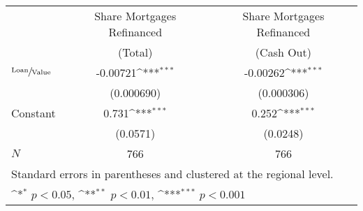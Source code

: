 {
\def\sym#1{\ifmmode^{#1}\else\(^{#1}\)\fi}
\begin{tabular}{l*{2}{c}}
\hline\hline
& Share Mortgages Refinanced   & Share Mortgages Refinanced \\
& (Total) & (Cash Out) \\ 
\hline
$\sfrac{\text{Loan}}{\text{Value}}$&    -0.00721\sym{***}&    -0.00262\sym{***}\\
            &  (0.000690)         &  (0.000306)         \\
Constant     &       0.731\sym{***}&       0.252\sym{***}\\
            &    (0.0571)         &    (0.0248)         \\
\hline
\(N\)       &         766         &         766         \\
\hline\hline
\multicolumn{3}{l}{\footnotesize Standard errors in parentheses and clustered at the regional level.}\\
\multicolumn{3}{l}{\footnotesize \sym{*} \(p<0.05\), \sym{**} \(p<0.01\), \sym{***} \(p<0.001\)}\\
\end{tabular}
}
